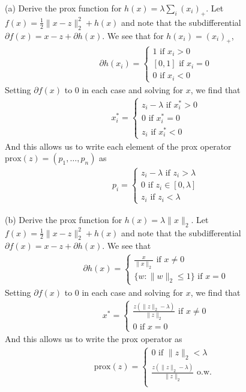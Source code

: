 (a) Derive the prox function for $h(x) = \lambda\sum_i (x_i)_+$.  Let $f(x) =
\frac{1}{2}\|x-z\|_2^2 + h(x)$ and note that the subdifferential $\partial f(x)
= x - z + \partial h(x)$. We see that for $h(x_i) = (x_i)_+$,
\begin{align*}
    \partial h(x_i) = 
        \begin{cases}
            1 \text{ if } x_i>0\\
            [0,1] \text{ if } x_i=0\\
            0 \text{ if } x_i<0
        \end{cases}
\end{align*}
Setting $\partial f(x)$ to 0 in each case and solving for $x$, we find that 
\begin{align*}
    x_i^* = 
    \begin{cases}
        z_i-\lambda \text{ if } x_i^* > 0\\
        0 \text{ if } x_i^* = 0\\
        z_i \text{ if } x_i^* < 0
    \end{cases}
\end{align*}
And this allows us to write each element of the prox operator
$\text{prox}(z) = (p_1,\ldots,p_n)$ as
\begin{align*}
    p_i = 
    \begin{cases}
        z_i-\lambda \text{ if } z_i > \lambda\\
        0 \text{ if } z_i \in [0,\lambda]\\
        z_i \text{ if } z_i < \lambda
    \end{cases}
\end{align*}

(b) Derive the prox function for $h(x) = \lambda\|x\|_2$.  Let $f(x) =
\frac{1}{2}\|x-z\|_2^2 + h(x)$ and note that the subdifferential $\partial f(x)
= x - z + \partial h(x)$. We see that 
\begin{align*}
    \partial h(x) = 
    \begin{cases}
        \frac{x}{\|x\|_2} \text{ if } x \neq 0\\
        \{w : \|w\|_2 \leq 1 \} \text{ if } x=0
    \end{cases}
\end{align*}
Setting $\partial f(x)$ to 0 in each case and solving for $x$, we find that 
\begin{align*}
    x^* = 
    \begin{cases}
        \frac{z(\|z\|_2-\lambda)}{\|z\|_2} \text{ if } x \neq 0\\
        0 \text{ if } x=0
    \end{cases}
\end{align*}
And this allows us to write the prox operator as
\begin{align*}
    \text{prox}(z) = 
    \begin{cases}
        0 \text{ if } \|z\|_2 < \lambda \\
        \frac{z(\|z\|_2-\lambda)}{\|z\|_2} \text{ o.w. }\\
    \end{cases}
\end{align*}

